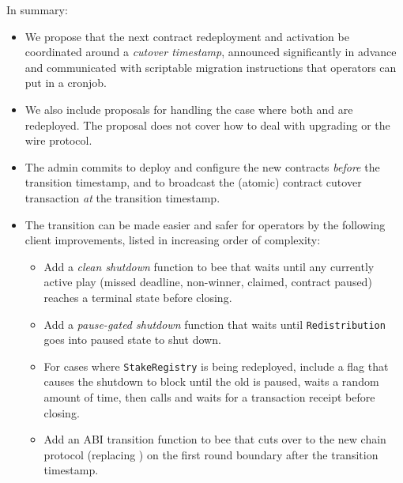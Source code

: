 In summary:
\begin{itemize}
  \item We propose that the next  contract redeployment and activation be coordinated around a \emph{cutover timestamp}, announced significantly in advance and communicated with scriptable migration instructions that operators can put in a cronjob.

  \item We also include proposals for handling the case where both  and  are redeployed. The proposal does not cover how to deal with upgrading  or the wire protocol.

  \item The admin commits to deploy and configure the new contracts \emph{before} the transition timestamp, and to broadcast the (atomic) contract cutover transaction \emph{at} the transition timestamp.

  \item The transition can be made easier and safer for operators by the following client improvements, listed in increasing order of complexity:
    \begin{itemize}
      \item Add a \emph{clean shutdown} function to bee that waits until any currently active play (missed deadline, non-winner, claimed, contract paused) reaches a terminal state before closing.
      \item Add a \emph{pause-gated shutdown} function that waits until \texttt{Redistribution} goes into paused state to shut down.
      \item For cases where \texttt{StakeRegistry} is being redeployed, include a flag that causes the shutdown to block until the old  is paused, waits a random amount of time, then calls  and waits for a transaction receipt before closing.
      \item Add an ABI transition function to bee that cuts over to the new chain protocol (replacing ) on the first round boundary after the transition timestamp.
    \end{itemize}
\end{itemize}

